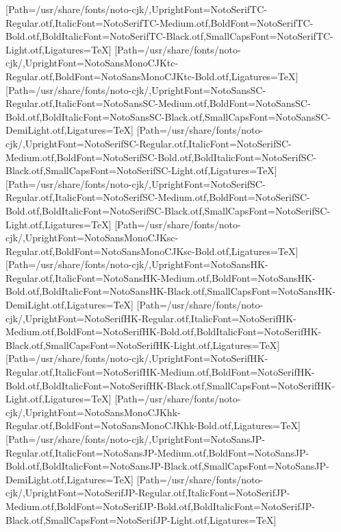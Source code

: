\newfontfamily{}[Path=/usr/share/fonts/noto-cjk/,UprightFont=NotoSerifTC-Regular.otf,ItalicFont=NotoSerifTC-Medium.otf,BoldFont=NotoSerifTC-Bold.otf,BoldItalicFont=NotoSerifTC-Black.otf,SmallCapsFont=NotoSerifTC-Light.otf,Ligatures=TeX]
\newfontfamily{}[Path=/usr/share/fonts/noto-cjk/,UprightFont=NotoSansMonoCJKtc-Regular.otf,BoldFont=NotoSansMonoCJKtc-Bold.otf,Ligatures=TeX]
\newfontfamily{}[Path=/usr/share/fonts/noto-cjk/,UprightFont=NotoSansSC-Regular.otf,ItalicFont=NotoSansSC-Medium.otf,BoldFont=NotoSansSC-Bold.otf,BoldItalicFont=NotoSansSC-Black.otf,SmallCapsFont=NotoSansSC-DemiLight.otf,Ligatures=TeX]
\newfontfamily{}[Path=/usr/share/fonts/noto-cjk/,UprightFont=NotoSerifSC-Regular.otf,ItalicFont=NotoSerifSC-Medium.otf,BoldFont=NotoSerifSC-Bold.otf,BoldItalicFont=NotoSerifSC-Black.otf,SmallCapsFont=NotoSerifSC-Light.otf,Ligatures=TeX]
\newfontfamily{}[Path=/usr/share/fonts/noto-cjk/,UprightFont=NotoSerifSC-Regular.otf,ItalicFont=NotoSerifSC-Medium.otf,BoldFont=NotoSerifSC-Bold.otf,BoldItalicFont=NotoSerifSC-Black.otf,SmallCapsFont=NotoSerifSC-Light.otf,Ligatures=TeX]
\newfontfamily{}[Path=/usr/share/fonts/noto-cjk/,UprightFont=NotoSansMonoCJKsc-Regular.otf,BoldFont=NotoSansMonoCJKsc-Bold.otf,Ligatures=TeX]
\newfontfamily{}[Path=/usr/share/fonts/noto-cjk/,UprightFont=NotoSansHK-Regular.otf,ItalicFont=NotoSansHK-Medium.otf,BoldFont=NotoSansHK-Bold.otf,BoldItalicFont=NotoSansHK-Black.otf,SmallCapsFont=NotoSansHK-DemiLight.otf,Ligatures=TeX]
\newfontfamily{}[Path=/usr/share/fonts/noto-cjk/,UprightFont=NotoSerifHK-Regular.otf,ItalicFont=NotoSerifHK-Medium.otf,BoldFont=NotoSerifHK-Bold.otf,BoldItalicFont=NotoSerifHK-Black.otf,SmallCapsFont=NotoSerifHK-Light.otf,Ligatures=TeX]
\newfontfamily{}[Path=/usr/share/fonts/noto-cjk/,UprightFont=NotoSerifHK-Regular.otf,ItalicFont=NotoSerifHK-Medium.otf,BoldFont=NotoSerifHK-Bold.otf,BoldItalicFont=NotoSerifHK-Black.otf,SmallCapsFont=NotoSerifHK-Light.otf,Ligatures=TeX]
\newfontfamily{}[Path=/usr/share/fonts/noto-cjk/,UprightFont=NotoSansMonoCJKhk-Regular.otf,BoldFont=NotoSansMonoCJKhk-Bold.otf,Ligatures=TeX]
\newfontfamily{}[Path=/usr/share/fonts/noto-cjk/,UprightFont=NotoSansJP-Regular.otf,ItalicFont=NotoSansJP-Medium.otf,BoldFont=NotoSansJP-Bold.otf,BoldItalicFont=NotoSansJP-Black.otf,SmallCapsFont=NotoSansJP-DemiLight.otf,Ligatures=TeX]
\newfontfamily{}[Path=/usr/share/fonts/noto-cjk/,UprightFont=NotoSerifJP-Regular.otf,ItalicFont=NotoSerifJP-Medium.otf,BoldFont=NotoSerifJP-Bold.otf,BoldItalicFont=NotoSerifJP-Black.otf,SmallCapsFont=NotoSerifJP-Light.otf,Ligatures=TeX]
